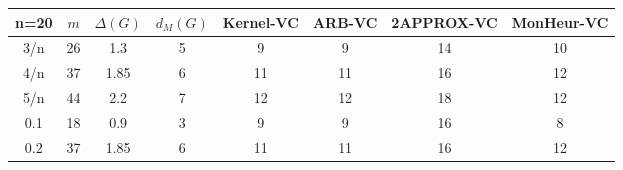 \begin{tabular}{||c||ccc||cccc||}
 \hline \hline 
 n=20&$m$&$\Delta (G)$&$d_M(G)$& Kernel-VC & ARB-VC & 2APPROX-VC & MonHeur-VC\\ \hline \hline
3/n&26&1.3&5&9&9&14&10\\
4/n&37&1.85&6&11&11&16&12\\
5/n&44&2.2&7&12&12&18&12\\
0.1&18&0.9&3&9&9&16&8\\
0.2&37&1.85&6&11&11&16&12\\
\hline \end{tabular}

